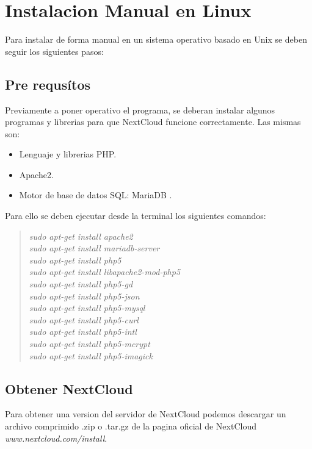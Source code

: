 \documentclass[11pt]{article}
\begin{document}
\clearpage

\section{Instalacion Manual en Linux}

Para instalar de forma manual en un sistema operativo basado en Unix se deben seguir los siguientes pasos:

\subsection{Pre requsítos}

Previamente a poner operativo el programa, se deberan instalar algunos programas y librerias para que NextCloud funcione correctamente.
Las mismas son:
\begin{itemize}
    \item Lenguaje y librerias PHP.
    \item Apache2.
    \item Motor de base de datos SQL: MariaDB .
\end{itemize}

Para ello se deben ejecutar desde la terminal los siguientes comandos:

\begin{quote}
\emph{sudo apt-get install apache2}\\
\emph{sudo apt-get install mariadb-server}\\
\emph{sudo apt-get install php5}\\
\emph{sudo apt-get install libapache2-mod-php5}\\
\emph{sudo apt-get install php5-gd}\\
\emph{sudo apt-get install php5-json}\\
\emph{sudo apt-get install php5-mysql}\\
\emph{sudo apt-get install php5-curl}\\
\emph{sudo apt-get install php5-intl}\\
\emph{sudo apt-get install php5-mcrypt}\\
\emph{sudo apt-get install php5-imagick}\\
\end{quote}


\subsection{Obtener NextCloud}
Para obtener una version del servidor de NextCloud podemos descargar un archivo comprimido .zip o .tar.gz de la pagina oficial de NextCloud \emph{www.nextcloud.com/install}.
\end{document}
